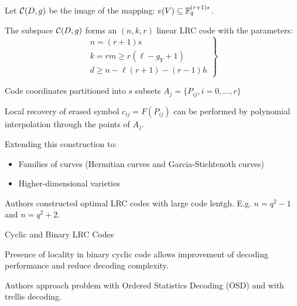 \begin{frame}
    Let $\mathcal{C}(D,g)$ be the image of the mapping: $e(V) \subseteq \mathbb{F}_q^{(r+1)s}$.
    \begin{theorem}
        The subspace $\mathcal{C}(D,g)$ forms an $(n,k,r)$ linear LRC code with the parameters:
        $$        
        \left.                
        \begin{matrix}
        n = (r+1)s \\
        k = rm \geq r(\ell - g_Y + 1) \\
        d \geq n - \ell ( r+1) - (r-1)h
        \end{matrix}                
        \right\rbrace
        $$
    \end{theorem}
    Code coordinates partitioned into $s$ subsets $A_j = \{P_{ij}, i = 0, ..., r\}$
    
    Local recovery of erased symbol $c_{ij} = F(P_{ij})$ can be performed by polynomial interpolation through the points of $A_j$.
\end{frame}

\begin{frame}
    Extending this construction to:
    \begin{itemize}
    \item Families of curves (Hermitian curves and Garcia-Stichtenoth curves)
    \item Higher-dimensional varieties
    \end{itemize}
    Authors constructed optimal LRC codes with large code lentgh. E.g. $n=q^2-1$ and $n=q^2+2$.
\end{frame}

\begin{frame}{Cyclic and Binary LRC Codes}

Presence of locality in binary cyclic code allows improvement of decoding performance and reduce decoding complexity.

Authors approach problem with Ordered Statistics Decoding (OSD) and with trellis decoding. \\~\\



\end{frame}

